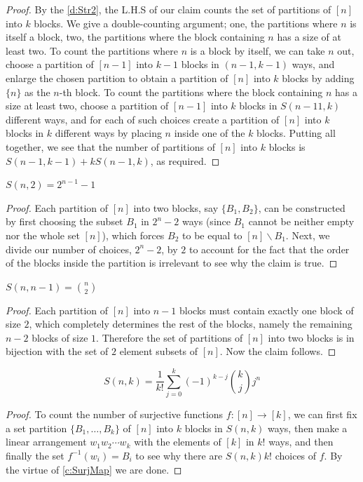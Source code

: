 \begin{proof}
By the \cref{d:Str2}, the L.H.S of our claim counts the set of partitions of $[n]$ into $k$ blocks. 
We give a double-counting argument; 
one, the partitions where $n$ is itself a block, two, the partitions where the block containing $n$ has a size of at least two. To count the partitions where $n$ is a block by itself, we can take $n$ out, choose a partition of $[n-1]$ into $k-1$ blocks in $(n-1,k-1)$ ways, and enlarge the chosen partition to obtain a partition of $[n]$ into $k$ blocks by adding $\{n\}$ as the $n$-th block. To count the partitions where the block containing $n$ has a size at least two, choose a partition of $[n-1]$ into $k$ blocks in $S(n-1 1,k)$ different ways, and for each of such choices create a partition of $[n]$ into $k$ blocks in $k$ different ways by placing $n$ inside one of the $k$ blocks. Putting all together, we see that the number of partitions of $[n]$ into $k$ blocks is $S(n-1, k-1)+kS(n-1, k)$, as required.
\end{proof}
\begin{claim}
    $S(n,2)=2^{n-1}-1$
\end{claim}
\begin{proof}
Each partition of $[n]$ into
two blocks, say $\{B_1, B_2\}$, can be constructed by first choosing the subset $B_1$ in $2^n-2$ ways (since $B_1$ cannot be neither empty nor the whole set $[n]$), which forces
$B_2$ to be equal to  $[n] \backslash B_1$. Next, we divide our number of choices, $2^n - 2$, by $2$ to account
for the fact that the order of the blocks inside the partition is irrelevant to see why the claim is true. 
\end{proof}
\begin{claim}
    $S(n,n-1)=\binom{n}{2}$
\end{claim}
\begin{proof}
Each partition of $[n]$ into $n-1$ blocks must contain exactly one block of size $2$, which completely determines the rest of the blocks, namely the remaining $n-2$ blocks of size $1$. Therefore the set of partitions of $[n]$ into two blocks is in bijection with the set of $2$ element subsets of $[n]$. Now the claim follows.
\end{proof}
\begin{claim}
    \[
    S(n,k) = \dfrac{1}{k!}\sum_{j=0}^{k}(-1)^{k-j}\binom{k}{j}j^n
    \]
\end{claim}
\begin{proof}
To count the number of surjective functions $f: [n] \to [k]$, we can first fix a set partition $\{B_1,\ldots,B_k\}$ of $[n]$ into $k$ blocks in $S(n,k)$ ways, then make a linear arrangement $w_1 w_2 \cdots w_k$ with the elements of $[k]$ in $k!$ ways, and then finally the set $f^{-1}(w_i) = B_i$ to see why there are $S(n, k)k!$ choices of $f$. By the virtue of \cref{c:SurjMap} we are done.
\end{proof}
